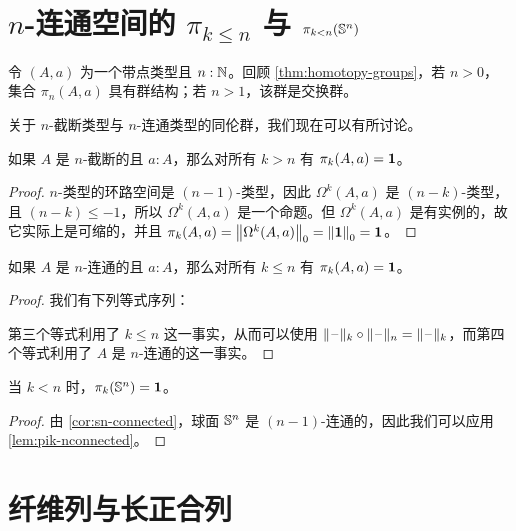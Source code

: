 \section{$n$-连通空间的 \texorpdfstring{$\pi_{k \le n}$}{π\_(k≤n)} 与 \texorpdfstring{$\pi_{k < n}(\Sn ^n)$}{π\_(k<n)(Sⁿ)}}
\label{sec:pik-le-n}

令 $(A,a)$ 为一个带点类型且 $n:\N$。回顾
\cref{thm:homotopy-groups}，若 $n>0$，集合 $\pi_n(A,a)$ 具有群结构；若 $n>1$，该群是交换群。

关于 $n$-截断类型与 $n$-连通类型的同伦群，我们现在可以有所讨论。

\begin{lem}
  如果 $A$ 是 $n$-截断的且 $a:A$，那么对所有 $k>n$ 有 $\pi_k(A,a)=\unit$。
\end{lem}

\begin{proof}
  $n$-类型的环路空间是 $(n-1)$-类型，因此 $\Omega^k(A,a)$ 是 $(n-k)$-类型，且 $(n-k)\le-1$，所以 $\Omega^k(A,a)$ 是一个命题。但 $\Omega^k(A,a)$ 是有实例的，故它实际上是可缩的，并且
  $\pi_k(A,a)=\trunc0{\Omega^k(A,a)}=\trunc0{\unit}=\unit$。
\end{proof}

\begin{lem} \label{lem:pik-nconnected}
  如果 $A$ 是 $n$-连通的且 $a:A$，那么对所有 $k\le{}n$ 有 $\pi_k(A,a)=\unit$。
\end{lem}

\begin{proof}
  我们有下列等式序列：
  第三个等式利用了 $k\le{}n$ 这一事实，从而可以使用 $\truncf k\circ\truncf n=\truncf k$，而第四个等式利用了 $A$ 是 $n$-连通的这一事实。
\end{proof}

\begin{cor}
  当 $k < n$ 时，$\pi_k(\Sn ^n) = \unit$。
\end{cor}

\begin{proof}
  由 \cref{cor:sn-connected}，球面 $\Sn^n$ 是 $(n-1)$-连通的，因此我们可以应用 \cref{lem:pik-nconnected}。
\end{proof}

\section{纤维列与长正合列}
\label{sec:long-exact-sequence-homotopy-groups}

